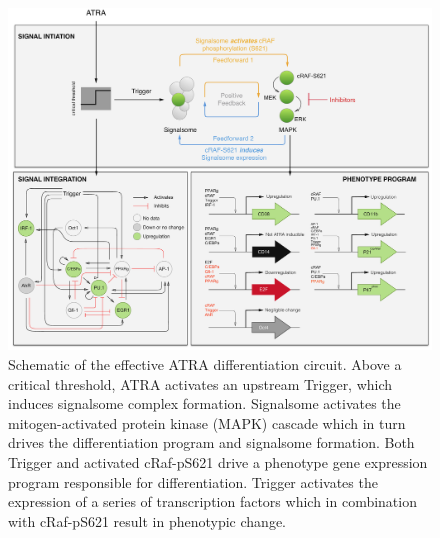 \documentclass[12pt]{article}
\begin{document}
\begin{center}
\begin{scriptsize}
\begin{supertabular}{c|l|l|l|l}
	\hline
	\end{supertabular}
	\end{scriptsize}

\end{center}

\clearpage

\begin{figure}[!t]
\includegraphics[width=1.0\textwidth]{./figs/Fig-1-Network_v3.pdf}
\caption{Schematic of the effective ATRA differentiation circuit.
Above a critical threshold, ATRA activates an upstream Trigger, which induces signalsome complex formation.
Signalsome activates the mitogen-activated protein kinase (MAPK) cascade which in turn
drives the differentiation program and signalsome formation.
Both Trigger and activated cRaf-pS621 drive a phenotype gene expression program responsible for differentiation.
Trigger activates the expression of a series of transcription factors which in combination with cRaf-pS621 result in phenotypic change.}\label{fig:network}
\end{figure}
\end{document}
